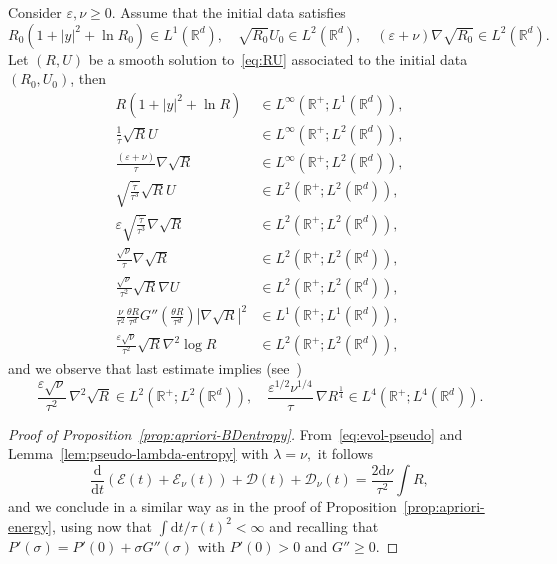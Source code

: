 \documentclass[10pt]{amsart}
\theoremstyle{definition}\newtheorem{defi}[theo]{Definition}\newtheorem{rema}[theo]{Remark}\newtheorem{exam}[theo]{Example}\newtheorem{exem}[theo]{Example}\newtheorem{nota}[theo]{Notation}
\newcommand*\R{\mathbb{R}}
\newcommand*\dd {\mathrm{d}}
\newcommand*\<{\left\langle}
\renewcommand*\>{\right\rangle}
\renewcommand*\ge{\geqslant}
\newcommand*\eps{\varepsilon}
\begin{document}
\begin{prop}\label{prop:apriori-BDentropy}
Consider $\eps, \nu \ge 0$. Assume that the initial data satisfies
\[
R_0(1+|y|^2 + \ln R_0) \in L^1(\R^d), \quad
\sqrt{R_0} U_0 \in L^2(\R^d), \quad (\eps+\nu) \nabla \sqrt{R_0} \in L^2(\R^d).
\]
Let $(R,U)$ be a smooth solution to~\eqref{eq:RU} associated to the initial data $(R_0,U_0)$, then
\begin{equation}\label{eq:apriori-BDentropy}
\begin{aligned}
R(1+|y|^2 + \ln R) &\in L^\infty(\R^+ ; L^1(\R^d)), \\
\frac{1}{\tau} \sqrt{R} U &\in L^\infty(\R^+ ; L^2 (\R^d)), \\
\frac{(\eps+\nu)}{\tau} \nabla \sqrt{R} &\in L^\infty(\R^+ ; L^2 (\R^d)), \\
\sqrt{\frac{\dot \tau}{\tau^3}} \sqrt R U &\in L^2(\R^+ ; L^2 (\R^d)), \\
\eps \sqrt{\frac{\dot \tau}{\tau^3}} \nabla \sqrt{R} &\in L^2(\R^+ ; L^2 (\R^d)), \\
\frac{\sqrt \nu}{\tau} \nabla \sqrt{R} &\in L^2(\R^+ ; L^2 (\R^d)), \\
\frac{\sqrt \nu}{\tau^2} \sqrt{R} \nabla U &\in L^2(\R^+ ; L^2 (\R^d)), \\
\frac{ \nu}{\tau^2} \frac{\theta R}{\tau^d} G'' \left(\frac{\theta R}{\tau^d} \right) |\nabla \sqrt R|^2 &\in L^1(\R^+;L^1(\R^d)),\\
\frac{\eps \sqrt \nu }{\tau^2} \sqrt R \nabla^2 \log R &\in L^2(\R^+ ; L^2 (\R^d)),
\end{aligned}
\end{equation}
and we observe that last estimate implies (see~\cite{Jungel,VasseurYu})
\[
\frac{\eps \sqrt \nu }{\tau^2} \, \nabla^2 \sqrt R \in L^2(\R^+ ; L^2 (\R^d)),
\quad
\frac{\eps^{1/2} \nu^{1/4} }{\tau} \, \nabla R^{\frac14} \in L^4(\R^+ ; L^4 (\R^d)).
\]
\end{prop}

\begin{proof}[Proof of Proposition~\ref{prop:apriori-BDentropy}]
From~\eqref{eq:evol-pseudo} and Lemma~\ref{lem:pseudo-lambda-entropy} with $\lambda = \nu,$ it follows
\[
\frac{\dd }{\dd t} \left(\mathcal E(t) + \mathcal E_{\nu}(t) \right) + \mathcal D(t) + \mathcal D_{\nu}(t) = \frac{2 \dd\nu}{\tau^2} \int R,
\]
and we conclude in a similar way as in the proof of Proposition~\ref{prop:apriori-energy}, using now that $\int \dd t/\tau(t)^{2} < \infty$ and recalling that $P'(\sigma) = P'(0) + \sigma G''(\sigma)$ with $P'(0) >0$ and $G'' \ge 0$.
\end{proof}
\end{document}
